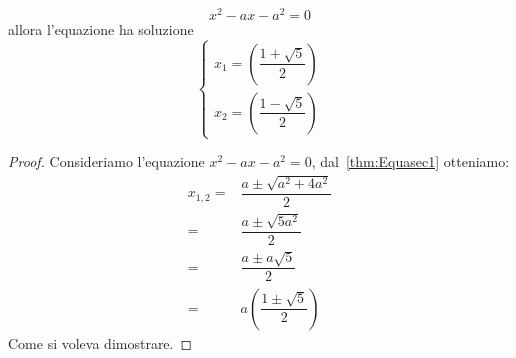 \begin{thm}[Phi]\label{thm:Equasec3Phi}
	\[x^2-ax-a^2=0 \] allora l'equazione ha soluzione \[\begin{cases}
		x_1=\left(\dfrac{1+\sqrt{5}}{2}\right) \\ 
		x_2=\left(\dfrac{1-\sqrt{5}}{2}\right) 
	\end{cases}\]
\end{thm}
\begin{proof}
Consideriamo l'equazione $x^2-ax-a^2=0$, dal~\cref{thm:Equasec1} otteniamo:
\begin{align*}
	x_{1,2}=&\dfrac{a\pm\sqrt{a^2+4a^2}}{2}\\
	=&\dfrac{a\pm\sqrt{5a^2}}{2}\\
	=&\dfrac{a\pm a\sqrt{5}}{2}\\
	=&a\left(\dfrac{1\pm\sqrt{5}}{2}\right)
\end{align*}
Come si voleva dimostrare.
\end{proof}
